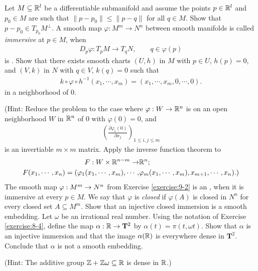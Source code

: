 \begin{enumerate}[\theexercise.1]
  \newchap[9]
  \NewItem Let $M\subseteq{\ensuremath{\mathbb{R}}}^l$ be a differentiable submanifold and assume the points
    $p\in {\ensuremath{\mathbb{R}}}^l$ and $p_0\in M$ are such that $\|p-p_0\|\le \|p-q\|$ for all $q\in M$. Show that
    $p-p_0\in T_{p_0}M^\perp$.
  \NewItem A smooth map $\varphi:M^m\to N^n$ between smooth manifolds is called \textit{immersive} at $p\in M$, when
    \begin{align*}
      D_p\varphi:T_pM\to T_{q}N, \qquad q\in\varphi(p)
    \end{align*}
    is . Show that there exists smooth charts $(U, h)$ in $M$ with $p\in U$, $h(p)=0$, and
    $(V, k)$ in $N$ with $q\in V$, $k(q)=0$ such that
    \begin{align*}
      k\circ\varphi\circ h^{-1}(x_1, \cdots, x_m) = (x_1, \cdots, x_m, 0, \cdots, 0).
    \end{align*}
    in a neighborhood of 0.\par
    \par(Hint: Reduce the problem to the case where $\varphi:W\to{\ensuremath{\mathbb{R}}}^n$ is on an open neighborhood $W$ in ${\mathbb{R}}^n$
    of 0 with $\varphi(0) = 0$, and
    \begin{align*}
      \left(\frac{\partial \varphi_i(0)}{\partial x_j}\right)_{1\le i,j\le m}
    \end{align*}
    is an invertiable $m\times m$ matrix. Apply the inverse function theorem to
    \begin{align*}
      F:W\times {\ensuremath{\mathbb{R}}}^{n-m}\to & {\mathbb{R}}^n;                       \\
      F(x_1, \cdots, x_n)
      = (
      \varphi_1(x_1, \cdots, x_m),
      \cdots,
                            & \varphi_m(x_1, \cdots, x_m),
      x_{m+1},
      \cdots,
      x_n
      ).)
    \end{align*}
  \NewItem The smooth map $\varphi: {M}^{m} \rightarrow  {N}^{n}$ from Exercise \ref{exercise:9-2} is an , when it is immersive at every $p \in  M$. We say that $\varphi$ is \textit{closed} if $\varphi ( A)$ is closed in ${N}^{n}$ for every closed set $A \subseteq  {M}^{m}$. Show that an injective closed immersion is a smooth embedding.
  \NewItem Let $\omega$ be an irrational real number. Using the notation of Exercise \ref{exercise:8-4}, define the map $\alpha  : \mathbb{R} \rightarrow  {\mathbf{T}}^{2}$ by $\alpha ( t)  = \pi ( {t,{\omega t}})$. Show that $\alpha$ is an injective immersion and that the image $\alpha ( \mathbb{R})$ is everywhere dense in ${\mathbf{T}}^{2}$. Conclude that $\alpha$ is not a smooth embedding.
    \par(Hint: The additive group $\mathbb{Z} + \mathbb{Z}\omega  \subseteq  \mathbb{R}$ is dense in $\mathbb{R}$.)

\end{enumerate}
